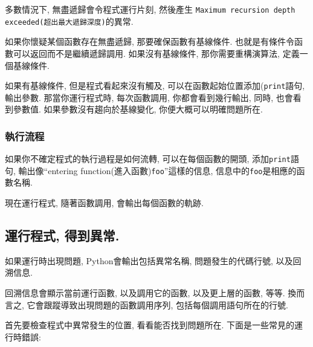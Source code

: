\documentclass[10pt]{book}
\begin{document}
多數情況下, 無盡遞歸會令程式運行片刻, 然後產生
{\tt Maximum recursion depth exceeded(超出最大遞歸深度)}的異常. 

如果你懷疑某個函數存在無盡遞歸, 那要確保函數有基線條件. 
也就是有條件令函數可以返回而不是繼續遞歸調用. 
如果沒有基線條件, 那你需要重構演算法, 定義一個基線條件. 

如果有基線條件, 但是程式看起來沒有觸及, 
可以在函數起始位置添加({\tt print}語句, 輸出參數. 
那當你運行程式時, 每次函數調用, 你都會看到幾行輸出, 
同時, 也會看到參數值. 
如果參數沒有趨向於基線變化, 你便大概可以明確問題所在. 


\subsubsection{執行流程}

如果你不確定程式的執行過程是如何流轉, 
可以在每個函數的開頭, 添加{\tt print}語句, 
輸出像``entering function(進入函數){\tt foo}''這樣的信息, 
信息中的{\tt foo}是相應的函數名稱.

現在運行程式, 隨著函數調用, 會輸出每個函數的軌跡. 


\subsection{運行程式, 得到異常.}

如果運行時出現問題, Python會輸出包括異常名稱, 
問題發生的代碼行號, 以及回溯信息. 

回溯信息會顯示當前運行函數, 以及調用它的函數, 以及更上層的函數, 等等. 
換而言之, 它會跟蹤導致出現問題的函數調用序列, 包括每個調用語句所在的行號. 

首先要檢查程式中異常發生的位置, 
看看能否找到問題所在. 
下面是一些常見的運行時錯誤:
\end{document}
